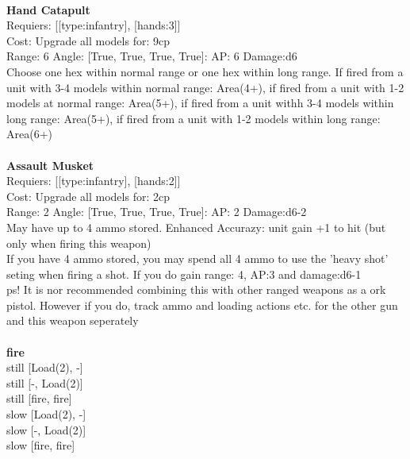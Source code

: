 \ \\
{\bf Hand Catapult } \\

Requiers: [[type:infantry], [hands:3]] \\
Cost: Upgrade all models for: 9cp \\


Range: 6  Angle: [True, True, True, True]: AP: 6 Damage:d6 \\
Choose one hex within normal range or one hex within long range. If fired from a unit with 3-4 models within normal range: Area(4+), if fired from a unit with 1-2 models at normal range: Area(5+), if fired from a unit withh 3-4 models within long range: Area(5+), if fired from a unit with 1-2 models within long range: Area(6+)\\ 








\ \\
{\bf Assault Musket } \\

Requiers: [[type:infantry], [hands:2]] \\
Cost: Upgrade all models for: 2cp \\


Range: 2  Angle: [True, True, True, True]: AP: 2 Damage:d6-2 \\
May have up to 4 ammo stored. Enhanced Accurazy: unit gain +1 to hit (but only when firing this weapon)\\ 
If you have 4 ammo stored, you may spend all 4 ammo to use the 'heavy shot' seting when firing a shot. If you do gain range: 4, AP:3 and damage:d6-1\\ 
 ps! It is nor recommended combining this with other ranged weapons as a ork pistol. However if you do, track ammo and loading actions etc. for the other gun and this weapon seperately\\ 







\ \\ {\bf fire } \\
still [Load(2), -] \\
still [-, Load(2)] \\
still [fire, fire] \\
slow [Load(2), -] \\
slow [-, Load(2)] \\
slow [fire, fire] \\

